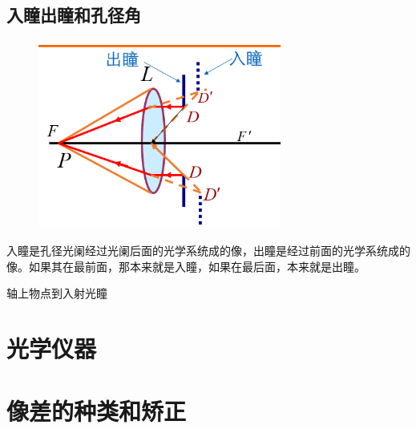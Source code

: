 \subsection{入瞳出瞳和孔径角}
        \begin{figure}[H]
            \centering
            \includegraphics[width=8cm]{img/4.1.png}
            \end{figure}
入瞳是孔径光阑经过光阑后面的光学系统成的像，出瞳是经过前面的光学系统成的像。如果其在最前面，那本来就是入瞳，如果在最后面，本来就是出瞳。
\begin{description}[leftmargin=0.7cm,style=nextline,nosep]%
    \item[物方孔径角] 轴上物点到入射光瞳 
\end{description}
\section{光学仪器}
\section{像差的种类和矫正}
